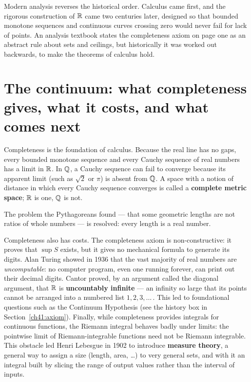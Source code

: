 \begin{aestheticbox}
Modern analysis reverses the historical order. Calculus came
first, and the rigorous construction of $\mathbb{R}$ came two centuries later, designed
so that bounded monotone sequences and continuous curves crossing zero
would never fail for lack of points. An analysis textbook states the
completeness axiom on page one as an abstract rule about sets and ceilings,
but historically it was worked out backwards, to make the theorems of calculus hold.
\end{aestheticbox}

\section{The continuum: what completeness gives, what it costs, and what comes next}
\label{ch41:what-next}

Completeness is the foundation of calculus. Because the real line has no gaps,
every bounded monotone sequence and every Cauchy sequence of real numbers has a limit in $\mathbb{R}$.
In $\mathbb{Q}$, a Cauchy sequence can fail to converge because its
apparent limit (such as $\sqrt{2}$ or $\pi$) is absent from $\mathbb{Q}$. A space with a notion of
distance in which every Cauchy sequence converges is called a \textbf{complete metric space};
$\mathbb{R}$ is one, $\mathbb{Q}$ is not.

The problem the Pythagoreans found --- that some geometric lengths are not ratios of whole
numbers --- is resolved: every length is a real number.

Completeness also has costs.
The completeness axiom is non-constructive: it proves that $\sup S$ exists,
but it gives no mechanical formula to generate its digits. Alan Turing showed in 1936 that
the vast majority of real numbers are \emph{uncomputable}: no computer program, even one
running forever, can print out their decimal digits. Cantor proved, by an argument called
the diagonal argument, that $\mathbb{R}$ is \textbf{uncountably infinite} --- an infinity so large
that its points cannot be arranged into a numbered list $1, 2, 3, \ldots\,$. This led to
foundational questions such as the Continuum Hypothesis (see the history box in
Section~\ref{ch41:axiom}). Finally, while completeness provides
integrals for continuous functions, the Riemann integral behaves badly under limits: the
pointwise limit of Riemann-integrable functions need not be Riemann integrable. This
obstacle led Henri Lebesgue in 1902 to introduce
\textbf{measure theory}, a general way to assign a size (length, area, \ldots) to very general
sets, and with it an integral built by slicing the range of output values rather than the
interval of inputs.

